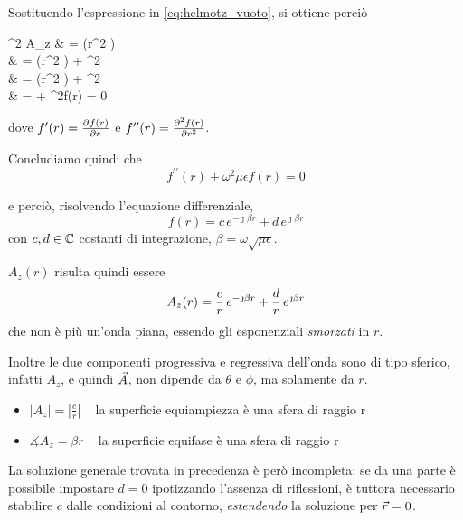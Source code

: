 Sostituendo l'espressione in \autoref{eq:helmotz_vuoto}, si ottiene perciò
\begin{esp*}
	\nabla^2 A_z
	& =  \left(r^2 \right) \\
	& =  \left(r^2 \right) + \omega^2 \mu\epsilon{} \\
	& =  \left(r^2 \right) + \omega^2 \mu\epsilon{}\\
	& =  
	+ \omega^2\mu\epsilon f(r) = 0\\
\end{esp*}
dove $f^\prime(r) = \deriv{f(r)}{r}$ e $f^{\prime\prime}(r) =\deriv[2]{f(r)}{r}$.

\smallbreak
Concludiamo quindi che
\begin{equation*}
	f^{\prime\prime}(r) + \omega^2\mu\epsilon f(r) = 0
\end{equation*}

e perciò, risolvendo l'equazione differenziale,
\begin{equation}
	f(r) = c \, e^{-\jmath \beta r} + d \, e^{\jmath \beta r}
\end{equation}
con $c,d \in \C$ costanti di integrazione, $\beta = \omega\sqrt{\mu\epsilon}$.

$A_z(r)$ risulta quindi essere
\begin{equation}
	A_z(r) = \frac{c}{r}\, \ejbr +\frac{d}{r}\, \ejbrp
\end{equation}
che non è più un'onda piana, essendo gli esponenziali \emph{smorzati} in $r$.

Inoltre le due componenti progressiva e regressiva dell'onda sono di tipo sferico, infatti $A_z$, e quindi $\A$, non dipende da $\theta$ e $\phi$, ma solamente da $r$.
\begin{itemize}
	\item $|A_z| = \left|\frac{c}{r}\right|$
	~ la superficie equiampiezza è una sfera di raggio r
	\item $\measuredangle A_z = \beta r$
	~ la superficie equifase è una sfera di raggio r
\end{itemize}

\smallbreak
La soluzione generale trovata in precedenza è però incompleta: se da una parte è possibile impostare $d = 0$ ipotizzando l'assenza di riflessioni, è tuttora necessario stabilire $c$ dalle condizioni al contorno, \emph{estendendo} la soluzione per $\r = 0$.

